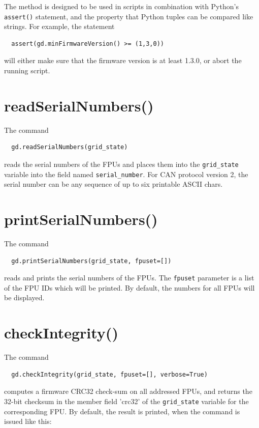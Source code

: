 \documentclass[fontsize=12,a4paper]{scrreprt}
\begin{document}
The method is designed to be used in scripts in combination with
Python's \texttt{assert()} statement, and the property that Python
tuples can be compared like strings. For example, the statement
\begin{verbatim}
  assert(gd.minFirmwareVersion() >= (1,3,0))
\end{verbatim}
will either make sure that the firmware version is at least 1.3.0, or
abort the running script.

\section{readSerialNumbers()}

The command
\begin{verbatim}
  gd.readSerialNumbers(grid_state)
\end{verbatim}
reads the serial numbers of the FPUs and places them into the
\texttt{grid\_state} variable into the field named
\texttt{serial\_number}. For CAN protocol version 2, the serial number
can be any sequence of up to six printable ASCII chars.


\section{printSerialNumbers()}

The command
\begin{verbatim}
  gd.printSerialNumbers(grid_state, fpuset=[])
\end{verbatim}
reads and prints the serial numbers of the FPUs.  The \texttt{fpuset}
parameter is a list of the FPU IDs which will be printed. By default,
the numbers for all FPUs will be displayed.


\section{checkIntegrity()}
%
%
%
%
%

The command
\begin{verbatim}
  gd.checkIntegrity(grid_state, fpuset=[], verbose=True)
\end{verbatim}
computes a firmware CRC32 check-sum on all addressed FPUs, and returns
the 32-bit checksum in the member field 'crc32' of the
\texttt{grid\_state} variable for the corresponding FPU. By default,
the result is printed, when the command is issued like this:
\end{document}
